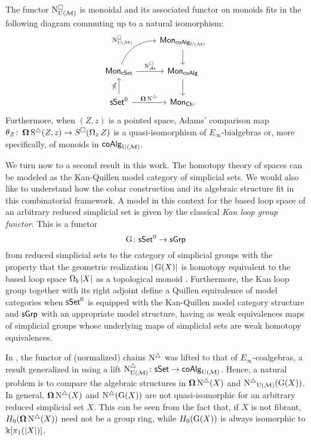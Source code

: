 \begin{theorem} \label{t:1st main thm in the intro}
	The functor $\operatorname{N^{\square}_{{\operatorname{U}(\mathcal{M})}}}$ is monoidal and its associated functor on monoids fits in the following diagram commuting up to a natural isomorphism:
	\[
	\begin{tikzcd}
	& \Mon_{\coAlg_\UM} \arrow[d] \\
	\Mon_{\cSet} \arrow[ru, "\cchainsUM", out=70, in=180] \arrow[r, "\cchainsAs"]
	& \Mon_{\coAlg} \arrow[d] \\
	\sSet^0 \arrow[r, "\cobar \schains"] \arrow[u, "\ccobar"]
	& \Mon_{\Ch}.
	\end{tikzcd}
	\]
	Furthermore, when $(Z, z)$ is a pointed space, Adams' comparison map $\theta_Z \colon \operatorname{\mathbf{\Omega}} \operatorname{S^{\triangle}}(Z, z) \to S^{\square}(\operatorname{\Omega}_z Z)$ is a quasi-isomorphism of $E_{\infty}$-bialgebras or, more specifically, of monoids in $\mathsf{coAlg}_{\operatorname{U}(\mathcal{M})}$.
\end{theorem} 

We turn now to a second result in this work.
The homotopy theory of spaces can be modeled as the Kan-Quillen model category of simplicial sets.
We would also like to understand how the cobar construction and its algebraic structure fit in this combinatorial framework.
A model in this context for the based loop space of an arbitrary reduced simplicial set is given by the classical \textit{Kan loop group functor}.
This is a functor 
\[
\operatorname{G} \colon \mathsf{sSet}^0 \to \mathsf{sGrp}
\]
from reduced simplicial sets to the category of simplicial groups with the property that the geometric realization $|\operatorname{G}(X)|$ is homotopy equivalent to the based loop space $\operatorname{\Omega}_b|X|$ as a topological monoid \cite{berger1995loops}.
Furthermore, the Kan loop group together with its right adjoint define a Quillen equivalence of model categories when $\mathsf{sSet}^0$ is equipped with the Kan-Quillen model category structure and $\mathsf{sGrp}$ with an appropriate model structure, having as weak equivalences maps of simplicial groups whose underlying maps of simplicial sets are weak homotopy equivalences.

In \cite{mcclure2003multivariable, berger2004combinatorial}, the functor of (normalized) chains $\operatorname{N^{\triangle}}$ was lifted to that of $E_{\infty}$-coalgebras, a result generalized in \cite{medina2020prop1} using a lift $\operatorname{N^{\triangle}_{{\operatorname{U}(\mathcal{M})}}} \colon \mathsf{sSet} \to \mathsf{coAlg}_{{\operatorname{U}(\mathcal{M})}}$.
Hence, a natural problem is to compare the algebraic structures in $\operatorname{\mathbf{\Omega}} \operatorname{N^{\triangle}}(X)$ and $\operatorname{N^{\triangle}}_{{\operatorname{U}(\mathcal{M})}}(\operatorname{G}(X))$.
In general, $\operatorname{\mathbf{\Omega}} \operatorname{N^{\triangle}}(X)$ and $\operatorname{N^{\triangle}}(\operatorname{G}(X))$ are not quasi-isomorphic for an arbitrary reduced simplicial set $X$.
This can be seen from the fact that, if $X$ is not fibrant, $H_0(\operatorname{\mathbf{\Omega}} \operatorname{N^{\triangle}}(X))$ need not be a group ring, while $H_0(\operatorname{G}(X))$ is always isomorphic to $ \Bbbk[\pi_1(|X|)]$.

